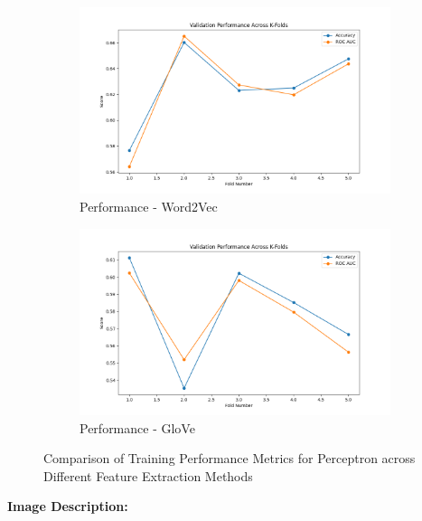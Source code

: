 \begin{figure}[H]
    \begin{subfigure}[b]{0.48\textwidth}
        \includegraphics[width=\textwidth]{img/report_info/img/2.1.Perceptron/best_perceptron_word2vec.png}
        \caption{Performance - Word2Vec}
        \label{fig:perc-word2vec}
    \end{subfigure}
    \begin{subfigure}[b]{0.48\textwidth}
        \includegraphics[width=\textwidth]{img/report_info/img/2.1.Perceptron/best_perceptron_glove.png}
        \caption{Performance - GloVe}
        \label{fig:perc-glove}
    \end{subfigure}
    
    \caption{Comparison of Training Performance Metrics for Perceptron across Different Feature Extraction Methods}
    \label{fig:perc-performance-group}
\end{figure}

\textbf{Image Description:}

